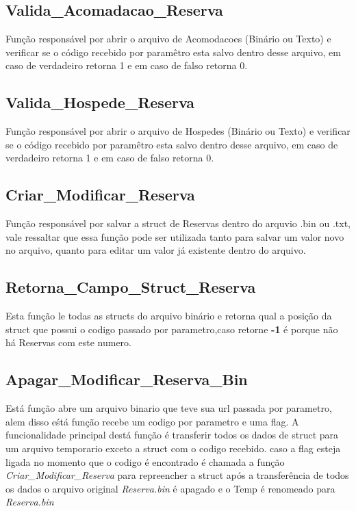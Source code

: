\documentclass{article}
\begin{document}
\subsection{Valida\_Acomadacao\_Reserva}
	Função responsável por abrir o arquivo de Acomodacoes (Binário ou Texto) e verificar se o código recebido por paramêtro esta salvo dentro desse arquivo, em caso de verdadeiro retorna 1 e em caso de falso retorna 0.
	
\subsection{Valida\_Hospede\_Reserva}
	Função responsável por abrir o arquivo de Hospedes (Binário ou Texto) e verificar se o código recebido por paramêtro esta salvo dentro desse arquivo, em caso de verdadeiro retorna 1 e em caso de falso retorna 0.

\subsection{Criar\_Modificar\_Reserva}
	Função responsável por salvar a struct de Reservas dentro do arquvio .bin ou .txt, vale ressaltar que essa função pode ser utilizada tanto para salvar um valor novo no arquivo, quanto para editar um valor já existente dentro do arquivo.

\subsection{Retorna\_Campo\_Struct\_Reserva}
	Esta função le todas as structs do arquivo binário e retorna qual a posição da struct que possui o codigo passado por parametro,caso retorne \textbf{-1} é porque não há Reservas com este numero.

\subsection{Apagar\_Modificar\_Reserva\_Bin}
	Está função abre um arquivo binario que teve sua  url passada por parametro, alem disso eśtá função recebe um codigo por parametro e uma flag.
	A funcionalidade principal destá função é transferir todos os dados de struct para um arquivo temporario exceto a struct com o codigo recebido. caso a flag esteja ligada no momento que o codigo é encontrado é chamada a função \textit{Criar\_Modificar\_Reserva} para repreencher a struct após a transferência de todos os dados o arquivo original \textit{Reserva.bin} é apagado e o Temp é renomeado para \textit{Reserva.bin}
\end{document}

